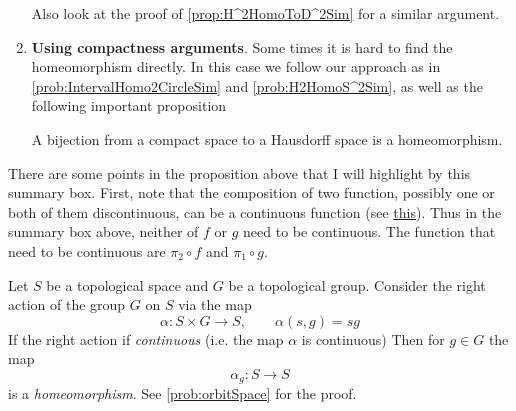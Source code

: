 \begin{summary}
\begin{enumerate}
\begin{itemize}
		\end{itemize}
					
		Also look at the proof of \autoref{prop:H^2HomoToD^2Sim} for a similar argument.
		
		\item \textbf{Using compactness arguments}. Some times it is hard to find the homeomorphism directly. In this case we follow our approach as in \autoref{prob:IntervalHomo2CircleSim} and \autoref{prob:H2HomoS^2Sim}, as well as the following important proposition
		\begin{proposition}
			A bijection from a compact space to a Hausdorff space is a homeomorphism.
		\end{proposition}
	\end{enumerate}
\end{summary}

\begin{summary}
	There are some points in the proposition above that I will highlight by this summary box. First, note that the composition of two function, possibly one or both of them discontinuous, can be a continuous function (see \href{https://math.stackexchange.com/questions/3080559/composition-of-discontinuous-functions#:~:text=A%20simple%20example%20of%20the,functions%20giving%20a%20continuous%20one.&text=g(x)%3Dx(,x)%2B%E2%8C%8Ax%E2%8C%8B.&text=(g%E2%88%98f)(x,discontinuous%20maps%20may%20be%20continuous.}{this}). Thus in the summary box above, neither of $ f $ or $ g $ need to be continuous. The function that need to be continuous are $ \pi_2\circ f $ and $ \pi_1\circ g $.
\end{summary}


\begin{summary}
	Let $ S $ be a topological space and $ G $ be a topological group. Consider the right action of the group $ G $ on $ S $ via the map 
	\[ \alpha : S \times G \to S, \qquad \alpha(s,g) = sg \]
	If the right action if \emph{continuous} (i.e. the map $ \alpha $ is continuous) Then for $ g \in G $ the map
	\[ \alpha_g: S \to S \]
	is a \emph{homeomorphism}. See \autoref{prob:orbitSpace} for the proof.
\end{summary}


